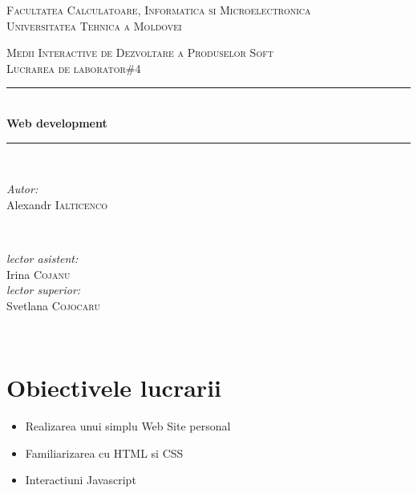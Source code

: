 \documentclass[12pt]{article}
\begin{document}
\begin{titlepage}
\begin{center} 
 \textsc{\large Facultatea Calculatoare, Informatica si Microelectronica}\\[0.5cm]
\textsc{\large Universitatea Tehnica a Moldovei}\\[1.2cm] 
\vspace{25 mm}

\textsc{\Large Medii Interactive de Dezvoltare a Produselor Soft}\\[0.5cm] 
\textsc{\large Lucrarea de laborator\#4}\\[0.5cm] \newcommand{\HRule}{\rule{\linewidth}{0.5mm}} 
  \vspace{10 mm}
  \HRule \\[0.4cm]
  { \LARGE \bfseries Web development  }\\[0.4cm] 
  \HRule \\[1.5cm]
      \vspace{30mm}

      \begin{minipage}{0.4\textwidth}
      \begin{flushleft} \large
      \emph{Autor:}\\
      Alexandr \textsc{Ialticenco}
      \end{flushleft}
      \end{minipage}
      ~
      \begin{minipage}{0.4\textwidth}
      \begin{flushright} \large
      \emph{lector asistent:} \\
      Irina \textsc{Cojanu} \\ 
      \emph{lector superior:} \\
      Svetlana \textsc{Cojocaru} 
      \end{flushright}
      \end{minipage}\\[4cm]

      \vspace{5 mm}

      \vfill
      \end{center}
      
\end{titlepage}

\section*{Obiectivele lucrarii}
\begin{itemize}
\item Realizarea unui simplu Web Site personal
\item Familiarizarea cu HTML si CSS
\item Interactiuni Javascript
\end{itemize}
\end{document}
